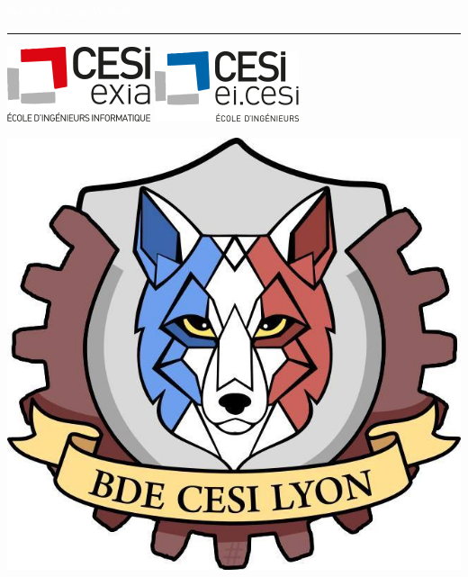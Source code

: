 \documentclass[letterpaper]{article}
\author{%
    Tanguy Blochet \
    Project Manager \
    \texttt{tanguy.blochet@viacesi.fr}\vspace{40pt} \
    Baptiste Saclier \
    Web developer \
    \texttt{baptiste.saclier@viacesi.fr}\vspace{40pt} \      
    Romain Junca \     
    Web developer \       
    \texttt{romain.junca@viacesi.fr}
    }
\makeatletter
\def\printauthor{%
    {\large \@author}}
\makeatother
\begin{document}
\renewcommand{\abstractname}{Abstract}
\begin{titlepage}
	\BgThispage
	\vspace*{2cm}
	\noindent
	\hspace{1cm}
	\textcolor{white}{\bigsf Student Union Website}
	\vspace*{3cm}\par
	\noindent
	\begin{minipage}{0.35\linewidth}
	    \begin{flushright}
	        \printauthor
	    \end{flushright}
	\end{minipage} \hspace{15pt}
	\begin{minipage}{0.02\linewidth}
	    \rule{1pt}{175pt}
	\end{minipage} \hspace{-10pt}
	\begin{minipage}{0.8\linewidth}
		\begin{center}
			\hspace{1cm}
				\includegraphics[scale=0.6]{img/logo_Exia.png}
				\hspace{20pt}
				\includegraphics[scale=0.6]{img/logo_EI.png.png}
				
				\vspace{1cm}
				\hspace{1cm}
				\includegraphics[scale=0.2]{img/logoBDE.jpg}
			\end{center}
			

\end{minipage}
\end{titlepage}
\end{document}
